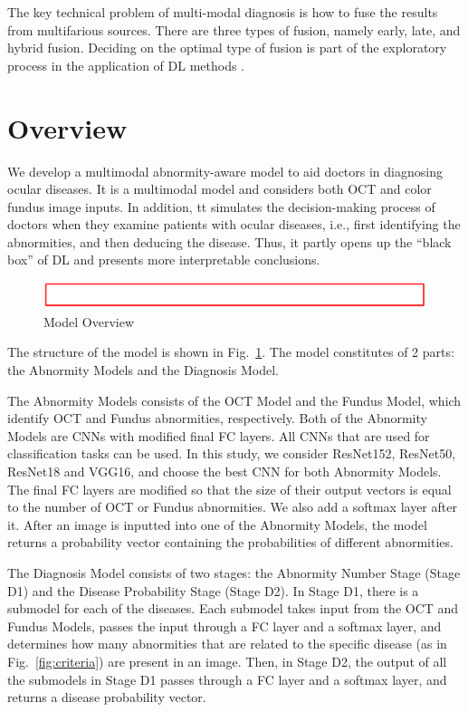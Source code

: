 \documentclass{article}
\begin{document}
		The key technical problem of multi-modal diagnosis is how to fuse the results from multifarious sources.  There are three types of fusion, namely early, late, and hybrid fusion.  Deciding on the optimal type of fusion is part of the exploratory process in the application of DL methods \autocite{Ichhpujani_Thakur_2021}.
		
		
	
	\section{Overview}
		
		We develop a multimodal abnormity-aware model to aid doctors in diagnosing ocular diseases. It is a multimodal model and considers both OCT and color fundus image inputs. In addition, tt simulates the decision-making process of doctors when they examine patients with ocular diseases, i.e., first identifying the abnormities, and then deducing the disease. Thus, it partly opens up the ``black box'' of DL and presents more interpretable conclusions. 
		
		\begin{figure}[htbp]
			\centering
			\includegraphics[width=\linewidth]{Figs/Temp.png}
			\caption{Model Overview}
			\vspace{0.3cm}
			\label{fig:3_parts}
		\end{figure}
		
		The structure of the model is shown in Fig.~\ref{fig:3_parts}. The model constitutes of 2 parts: the Abnormity Models and the Diagnosis Model. 
		
		The Abnormity Models consists of the OCT Model and the Fundus Model, which identify OCT and Fundus abnormities, respectively. Both of the Abnormity Models are CNNs with modified final FC layers. All CNNs that are used for classification tasks can be used. In this study, we consider ResNet152, ResNet50, ResNet18 and VGG16, and choose the best CNN for both Abnormity Models. The final FC layers are modified so that the size of their output vectors is equal to the number of OCT or Fundus abnormities. We also add a softmax layer after it. After an image is inputted into one of the Abnormity Models, the model returns a probability vector containing the probabilities of different abnormities.
		
		The Diagnosis Model consists of two stages: the Abnormity Number Stage (Stage D1) and the Disease Probability Stage (Stage D2). In Stage D1, there is a submodel for each of the diseases. Each submodel takes input from the OCT and Fundus Models, passes the input through a FC layer and a softmax layer, and determines how many abnormities that are related to the specific disease (as in Fig.~\ref{fig:criteria}) are present in an image. Then, in Stage D2, the output of all the submodels in Stage D1 passes through a FC layer and a softmax layer, and returns a disease probability vector.
		
\end{document}
